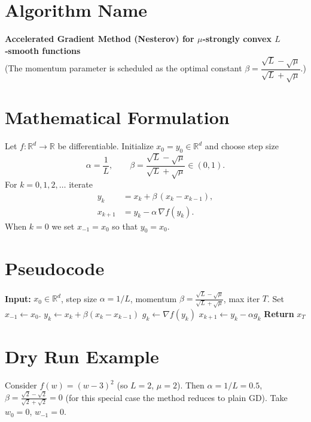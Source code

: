 \documentclass{article}
\newcommand{\R}{\mathbb{R}}
\begin{document}
\section*{Algorithm Name}
\textbf{Accelerated Gradient Method (Nesterov) for $\mu$‑strongly convex $L$‑smooth functions}\\
(The momentum parameter is scheduled as the optimal constant 
$\beta = \dfrac{\sqrt{L}-\sqrt{\mu}}{\sqrt{L}+\sqrt{\mu}}$.)

\section*{Mathematical Formulation}
Let $f:\R^{d}\rightarrow\R$ be differentiable.  
Initialize $x_{0}=y_{0}\in\R^{d}$ and choose step size 
\[
\alpha=\frac{1}{L},\qquad 
\beta=\frac{\sqrt{L}-\sqrt{\mu}}{\sqrt{L}+\sqrt{\mu}}\in(0,1).
\]
For $k=0,1,2,\dots$ iterate
\begin{align}
y_{k} &= x_{k}+ \beta\,(x_{k}-x_{k-1}), \label{eq:y}\\
x_{k+1} &= y_{k}-\alpha \,\nabla f(y_{k}). \label{eq:x}
\end{align}
When $k=0$ we set $x_{-1}=x_{0}$ so that $y_{0}=x_{0}$.

\section*{Pseudocode}
\begin{algorithm}[H]
\caption{Accelerated Gradient (Nesterov) }
\begin{algorithmic}[1]
\State \textbf{Input:} $x_{0}\in\R^{d}$, step size $\alpha=1/L$, momentum $\beta=\frac{\sqrt{L}-\sqrt{\mu}}{\sqrt{L}+\sqrt{\mu}}$, max iter $T$.
\State Set $x_{-1}\gets x_{0}$.
    \State $y_{k}\gets x_{k}+ \beta (x_{k}-x_{k-1})$ \hfill{}
    \State $g_{k}\gets \nabla f(y_{k})$
    \State $x_{k+1}\gets y_{k}-\alpha g_{k}$ \hfill{}
\EndFor
\State \textbf{Return} $x_{T}$
\end{algorithmic}
\end{algorithm}

\section*{Dry Run Example}
Consider $f(w)=(w-3)^{2}$ (so $L=2$, $\mu=2$).  
Then $\alpha=1/L=0.5$, $\beta=\frac{\sqrt{2}-\sqrt{2}}{\sqrt{2}+\sqrt{2}}=0$ (for this special case the method reduces to plain GD).  
Take $w_{0}=0$, $w_{-1}=0$.
\end{document}
